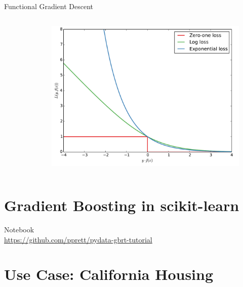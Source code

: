 \documentclass[a4paper,presentation]{beamer}
\begin{document}
\begin{frame}{Functional Gradient Descent}
\begin{columns}[c]
\begin{column}{.5\textwidth}
\begin{figure}
        \end{figure}
      \end{column}
      \begin{column}{.5\textwidth}
        \begin{figure}
          \includegraphics[scale=0.2]{./images/clf-loss-func.pdf}
        \end{figure}
      \end{column}
    \end{columns}

\end{frame}

\section{Gradient Boosting in scikit-learn}

\begin{frame}[plain]
  \begin{center}
    {\Large Notebook}\\
    \vspace{0.2cm}
    \href{https://github.com/pprett/pydata-gbrtm-tutorial}{https://github.com/pprett/pydata-gbrt-tutorial}\\
  \end{center}
\end{frame}

\section{Use Case: California Housing}
\end{document}
